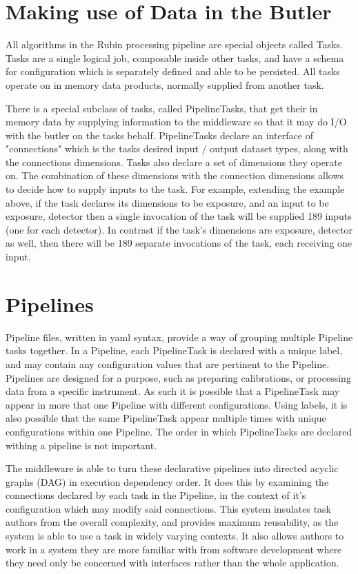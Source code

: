 \section{Making use of Data in the Butler}
All algorithms in the Rubin processing pipeline are special objects called Tasks. Tasks are a single logical job, composable inside other tasks, and have a schema for configuration which is separately defined and able to be persisted. All tasks operate on in memory data products, normally supplied from another task.

There is a special subclass of tasks, called PipelineTasks, that get their in memory data by supplying information to the middleware so that it may do I/O with the butler on the tasks behalf. PipelineTasks declare an interface of "connections" which is the tasks desired input / output dataset types, along with the connections dimensions. Tasks also declare a set of dimensions they operate on. The combination of these dimensions with the connection dimensions allows to decide how to supply inputs to the task. For example, extending the example above, if the task declares its dimensions to be exposure, and an input to be exposure, detector then a single invocation of the task will be supplied 189 inputs (one for each detector). In contrast if the task's dimensions are exposure, detector as well, then there will be 189 separate invocations of the task, each receiving one input.

\section{Pipelines}
Pipeline files, written in yaml syntax, provide a way of grouping multiple Pipeline tasks together. In a Pipeline, each PipelineTask is declared with a unique label, and may contain any configuration values that are pertinent to the Pipeline. Pipelines are designed for a purpose, such as preparing calibrations, or processing data from a specific instrument. As such it is possible that a PipelineTask may appear in more that one Pipeline with different configurations. Using labels, it is also possible that the same PipelineTask appear multiple times with unique configurations within one Pipeline. The order in which PipelineTasks are declared withing a pipeline is not important.

The middleware is able to turn these declarative pipelines into directed acyclic graphs (DAG) in execution dependency order. It does this by examining the connections declared by each task in the Pipeline, in the context of it's configuration which may modify said connections. This system insulates task authors from the overall complexity, and provides maximum reusability, as the system is able to use a task in widely varying contexts. It also allows authors to work in a system they are more familiar with from software development where they need only be concerned with interfaces rather than the whole application.

